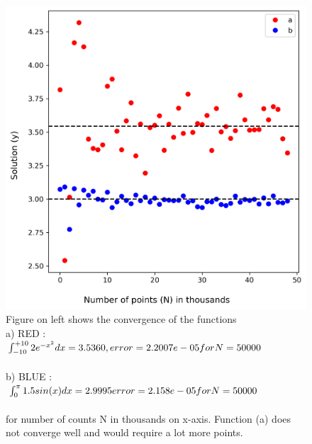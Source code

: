 \documentclass{article}
\begin{document}
\begin{figure}[H]

    \begin{minipage}[c]{0.5\textwidth}
    \includegraphics[width=\textwidth]{q-6.png}
    \end{minipage}\hfill
    \begin{minipage}[c]{0.5\textwidth}
    \caption{
        Figure on left shows the convergence of the functions \\
        a) RED : $\int_{-10}^{+10} 2e^{-x^{2}} dx = 3.5360, \\ \\ error = 2.2007e-05 for N = 50000\quad$ \\ \\
        b) BLUE : $\int_{0}^{\pi} 1.5 sin(x) dx = 2.9995 \\ \\ error =2.158e-05 for N = 50000\quad$ \\ \\
        for number of counts N in thousands on x-axis. Function (a) does not 
        converge well and would require a lot more points.
    } \label{fig:task-6}
    \end{minipage}
\end{figure}
\end{document}
